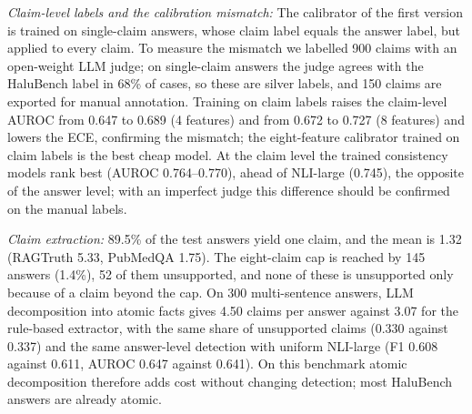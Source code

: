 \documentclass[conference]{IEEEtran}
\begin{document}
\textit{Claim-level labels and the calibration mismatch:} The calibrator of the first version is trained on single-claim answers, whose claim label equals the answer label, but applied to every claim. To measure the mismatch we labelled 900 claims with an open-weight LLM judge; on single-claim answers the judge agrees with the HaluBench label in 68\% of cases, so these are silver labels, and 150 claims are exported for manual annotation. Training on claim labels raises the claim-level AUROC from 0.647 to 0.689 (4 features) and from 0.672 to 0.727 (8 features) and lowers the ECE, confirming the mismatch; the eight-feature calibrator trained on claim labels is the best cheap model. At the claim level the trained consistency models rank best (AUROC 0.764--0.770), ahead of NLI-large (0.745), the opposite of the answer level; with an imperfect judge this difference should be confirmed on the manual labels.

\textit{Claim extraction:} 89.5\% of the test answers yield one claim, and the mean is 1.32 (RAGTruth 5.33, PubMedQA 1.75). The eight-claim cap is reached by 145 answers (1.4\%), 52 of them unsupported, and none of these is unsupported only because of a claim beyond the cap. On 300 multi-sentence answers, LLM decomposition into atomic facts gives 4.50 claims per answer against 3.07 for the rule-based extractor, with the same share of unsupported claims (0.330 against 0.337) and the same answer-level detection with uniform NLI-large (F1 0.608 against 0.611, AUROC 0.647 against 0.641). On this benchmark atomic decomposition therefore adds cost without changing detection; most HaluBench answers are already atomic.
\end{document}
